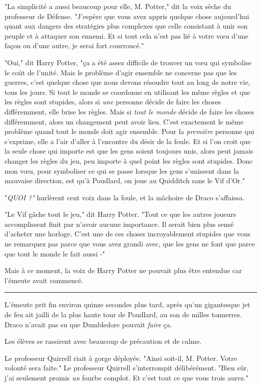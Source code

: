 "La simplicité a aussi beaucoup pour elle, M. Potter," dit la voix sèche du professeur de Défense. "J'espère que vous avez appris quelque chose aujourd'hui quant aux dangers des stratégies plus complexes que celle consistant à unir son peuple et à attaquer son ennemi. Et si tout cela n'est pas lié à votre vœu d'une façon ou d'une autre, je serai fort courroucé."

"Oui," dit Harry Potter, "ça a été assez difficile de trouver un vœu qui symbolise le coût de l'unité. Mais le problème d'agir ensemble ne concerne pas que les guerres, c'est quelque chose que nous devons résoudre tout au long de notre vie, tous les jours. Si tout le monde se coordonne en utilisant les même règles et que les règles sont stupides, alors si \emph{une}  personne décide de faire les choses différemment, elle brise les règles. Mais si \emph{tout le monde}  décide de faire les choses différemment, alors un changement peut avoir lieu. C'est exactement le même problème quand tout le monde doit agir ensemble. Pour la \emph{première}  personne qui s'exprime, elle a l'air d'aller à l'encontre du désir de la foule. Et si l'on croit que la seule chose qui importe est que les gens soient toujours unis, alors peut jamais changer les règles du jeu, peu importe à quel point les règles sont stupides. Donc mon vœu, pour symboliser ce qui se passe lorsque les gens s'unissent dans la mauvaise direction, est qu'à Poudlard, on joue au Quidditch sans le Vif d'Or."

"\emph{QUOI ?"}  hurlèrent cent voix dans la foule, et la mâchoire de Draco s'affaissa.

"Le Vif gâche tout le jeu," dit Harry Potter. "Tout ce que les autres joueurs accomplissent finit par n'avoir aucune importance. Il serait bien plus sensé d'acheter une horloge. C'est une de ces choses incroyablement stupides que vous ne remarquez pas parce que vous avez grandi avec, que les gens ne font que parce que tout le monde le fait aussi -"

Mais à ce moment, la voix de Harry Potter ne pouvait plus être entendue car l'émeute avait commencé.
\par\noindent\rule{\textwidth}{0.4pt}
L'émeute prit fin environ quinze secondes plus tard, après qu'un gigantesque jet de feu ait jailli de la plus haute tour de Poudlard, au son de milles tonnerres. Draco n'avait pas su que Dumbledore pouvait \emph{faire}  ça.

Les élèves se rassirent avec beaucoup de précaution et de calme.

Le professeur Quirrell riait à gorge déployée. "Ainsi soit-il, M. Potter. Votre volonté sera faite." Le professeur Quirrell s'interrompit délibérément. "Bien sûr, j'ai seulement promis \emph{un}  fourbe complot. Et c'est tout ce que vous trois aurez."

